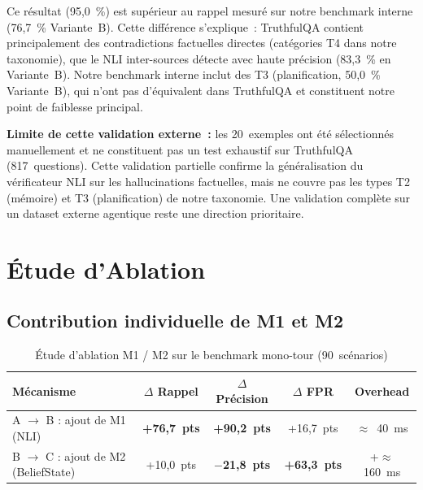 \documentclass[12pt,a4paper]{article}
\begin{document}
Ce résultat (95,0~\%) est supérieur au rappel mesuré sur notre benchmark interne (76,7~\% Variante~B). Cette différence s'explique~: TruthfulQA contient principalement des contradictions factuelles directes (catégories T4 dans notre taxonomie), que le NLI inter-sources détecte avec haute précision (83,3~\% en Variante~B). Notre benchmark interne inclut des T3 (planification, 50,0~\% Variante~B), qui n'ont pas d'équivalent dans TruthfulQA et constituent notre point de faiblesse principal.

\textbf{Limite de cette validation externe~:} les 20~exemples ont été sélectionnés manuellement et ne constituent pas un test exhaustif sur TruthfulQA (817~questions). Cette validation partielle confirme la généralisation du vérificateur NLI sur les hallucinations factuelles, mais ne couvre pas les types T2 (mémoire) et T3 (planification) de notre taxonomie. Une validation complète sur un dataset externe agentique reste une direction prioritaire.

\section{Étude d'Ablation}

\subsection{Contribution individuelle de M1 et M2}

\begin{table}[H]
\centering
\caption{Étude d'ablation M1 / M2 sur le benchmark mono-tour (90~scénarios)}
\label{tab:ablation_global}
\renewcommand{\arraystretch}{1.25}
\begin{tabular}{lcccc}
\toprule
\textbf{Mécanisme} & \textbf{$\Delta$ Rappel} & \textbf{$\Delta$ Précision} & \textbf{$\Delta$ FPR} & \textbf{Overhead} \\
\midrule
A $\to$ B : ajout de M1 (NLI) & \textbf{+76,7~pts} & \textbf{+90,2~pts} & +16,7~pts & $\approx$~40~ms \\
B $\to$ C : ajout de M2 (BeliefState) & +10,0~pts & \textbf{$-$21,8~pts} & \textbf{+63,3~pts} & +$\approx$160~ms \\
\bottomrule
\end{tabular}
\end{table}
\end{document}

